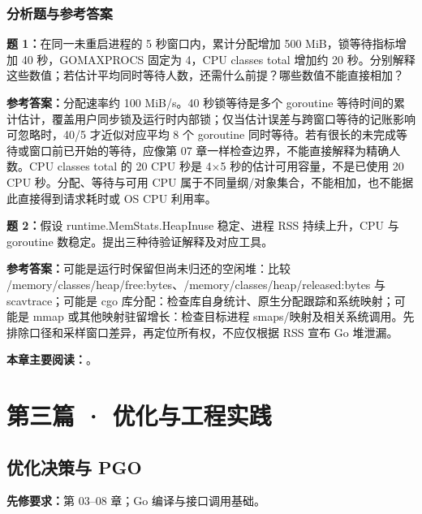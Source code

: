 \documentclass[UTF8,fontset=fandol,openany,11pt]{ctexbook}
\begin{document}
\section{分析题与参考答案}
\noindent\textbf{题 1：}在同一未重启进程的 5 秒窗口内，累计分配增加 500 MiB，锁等待指标增加 40 秒，GOMAXPROCS 固定为 4，CPU classes total 增加约 20 秒。分别解释这些数值；若估计平均同时等待人数，还需什么前提？哪些数值不能直接相加？

\noindent\textbf{参考答案：}分配速率约 100 MiB/s。40 秒锁等待是多个 goroutine 等待时间的累计估计，覆盖用户同步锁及运行时内部锁；仅当估计误差与跨窗口等待的记账影响可忽略时，40/5 才近似对应平均 8 个 goroutine 同时等待。若有很长的未完成等待或窗口前已开始的等待，应像第 07 章一样检查边界，不能直接解释为精确人数。CPU classes total 的 20 CPU 秒是 4\ensuremath{\times}5 秒的估计可用容量，不是已使用 20 CPU 秒。分配、等待与可用 CPU 属于不同量纲/对象集合，不能相加，也不能据此直接得到请求耗时或 OS CPU 利用率。

\noindent\textbf{题 2：}假设 runtime.MemStats.HeapInuse 稳定、进程 RSS 持续上升，CPU 与 goroutine 数稳定。提出三种待验证解释及对应工具。

\noindent\textbf{参考答案：}可能是运行时保留但尚未归还的空闲堆：比较 /memory/classes/heap/free:bytes、/memory/classes/heap/released:bytes 与 scavtrace；可能是 cgo 库分配：检查库自身统计、原生分配跟踪和系统映射；可能是 mmap 或其他映射驻留增长：检查目标进程 smaps/映射及相关系统调用。先排除口径和采样窗口差异，再定位所有权，不应仅根据 RSS 宣布 Go 堆泄漏。

\medskip\noindent\textbf{本章主要阅读：}\cite{tools-metrics}\cite{tools-metrics-read}\cite{tools-runtime-debug}\cite{tools-go125}\cite{tools-http-pprof}\cite{tools-perf}\cite{tools-strace}\cite{tools-ebpf}\cite{tools-runtime-debug-api}\cite{tools-fgprof}\cite{tools-fgprof-source}\cite{tools-gops}\cite{tools-gops-agent}\cite{tools-expvar}\cite{tools-nm}\cite{tools-objdump}。
\part*{第三篇 · 优化与工程实践}
\chapter{优化决策与 PGO}
\label{ch:11}
\par\medskip
\noindent\textbf{先修要求：}第 03–08 章；Go 编译与接口调用基础。
\end{document}

